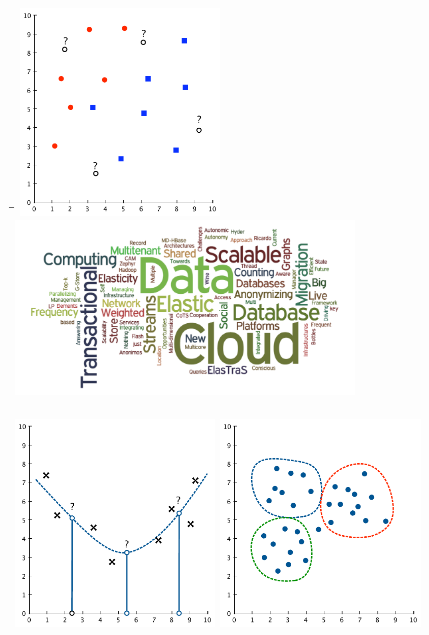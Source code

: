 \documentclass[landscape,footrule]{foils}
\begin{document}
\titlefoil

\enlargethispage{1cm}


\enlargethispage{3cm}
\begin{tabbing}
 \hspace*{2cm}\=\hspace*{10cm}\=\kill
   \>\includegraphics[height = 5.5cm]{classification} \> \includegraphics[width = 9cm]{word-cloud}\\  \vspace*{1cm} \\
   \>\includegraphics[height = 5.5cm]{regression}   \>  \includegraphics[height =5.5cm]{clustering}\\
\end{tabbing}
\end{document}
